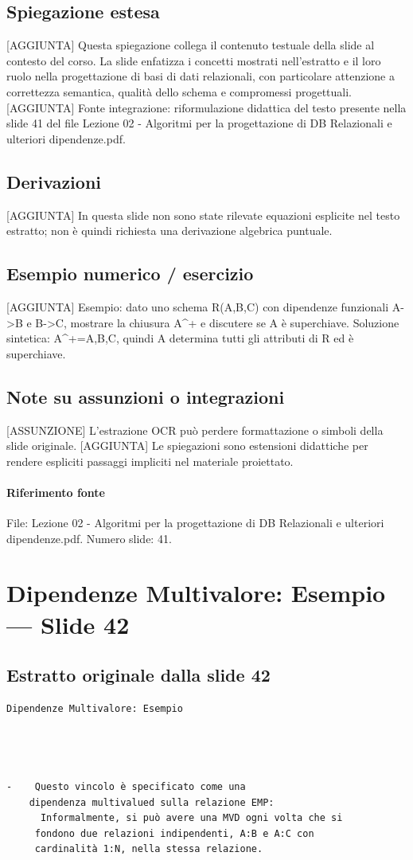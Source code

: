 \documentclass[11pt]{article}
\begin{document}
\subsection*{Spiegazione estesa}
[AGGIUNTA] Questa spiegazione collega il contenuto testuale della slide al contesto del corso. La slide enfatizza i concetti mostrati nell'estratto e il loro ruolo nella progettazione di basi di dati relazionali, con particolare attenzione a correttezza semantica, qualità dello schema e compromessi progettuali.
[AGGIUNTA] Fonte integrazione: riformulazione didattica del testo presente nella slide 41 del file Lezione 02 - Algoritmi per la progettazione di DB Relazionali e ulteriori dipendenze.pdf.
\subsection*{Derivazioni}
[AGGIUNTA] In questa slide non sono state rilevate equazioni esplicite nel testo estratto; non è quindi richiesta una derivazione algebrica puntuale.
\subsection*{Esempio numerico / esercizio}
[AGGIUNTA] Esempio: dato uno schema R(A,B,C) con dipendenze funzionali A->B e B->C, mostrare la chiusura A^+ e discutere se A è superchiave. Soluzione sintetica: A^+={A,B,C}, quindi A determina tutti gli attributi di R ed è superchiave.
\subsection*{Note su assunzioni o integrazioni}
[ASSUNZIONE] L'estrazione OCR può perdere formattazione o simboli della slide originale.
[AGGIUNTA] Le spiegazioni sono estensioni didattiche per rendere espliciti passaggi impliciti nel materiale proiettato.
\paragraph{Riferimento fonte} File: Lezione 02 - Algoritmi per la progettazione di DB Relazionali e ulteriori dipendenze.pdf. Numero slide: 41.
\section{Dipendenze Multivalore: Esempio --- Slide 42}
\subsection*{Estratto originale dalla slide 42}
\begin{lstlisting}
Dipendenze Multivalore: Esempio




-    Questo vincolo è specificato come una
    dipendenza multivalued sulla relazione EMP:
      Informalmente, si può avere una MVD ogni volta che si
     fondono due relazioni indipendenti, A:B e A:C con
     cardinalità 1:N, nella stessa relazione.
\end{lstlisting}
\end{document}
